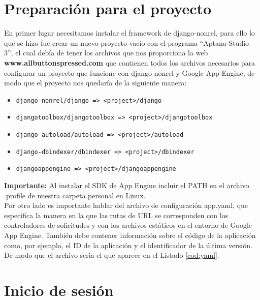 \section{Preparación para el proyecto}
\label{4:sec3}

En primer lugar necesitamos instalar el framework de django-nonrel, para ello lo que se hizo fue crear un nuevo proyecto vacío con el 
programa ``Aptana Studio 3'', el cual debía de tener los archivos que nos proporciona la web \textbf{www.allbuttonspressed.com} \cite{URL:DjangoNonrel} que contienen 
todos los archivos necesarios para configurar un proyecto que funcione con django-nonrel y Google App Engine, 
de modo que el proyecto nos quedaría de la siguiente manera:

\begin{itemize}
  \item \lstinline!django-nonrel/django => <project>/django!
  \item \lstinline!djangotoolbox/djangotoolbox => <project>/djangotoolbox!
  \item \lstinline!django-autoload/autoload => <project>/autoload!
  \item \lstinline!django-dbindexer/dbindexer => <project>/dbindexer!
  \item \lstinline!djangoappengine => <project>/djangoappengine!
\end{itemize}

\textbf{Importante:} Al instalar el SDK de App Engine incluir el PATH en el archivo .profile de nuestra carpeta personal en Linux.\\

Por otro lado es importante hablar del archivo de configuración app.yaml, que especifica la manera en la que las rutas de URL se corresponden con los 
controladores de solicitudes y con los archivos estáticos en el entorno de Google App Engine. 
También debe contener información sobre el código de la aplicación como, por ejemplo, el ID de la aplicación y el identificador de la última versión.\\

De modo que el archivo seria el que aparece en el Listado \ref{cod:yaml}.\\



\section{Inicio de sesión}
\label{4:sec4}

